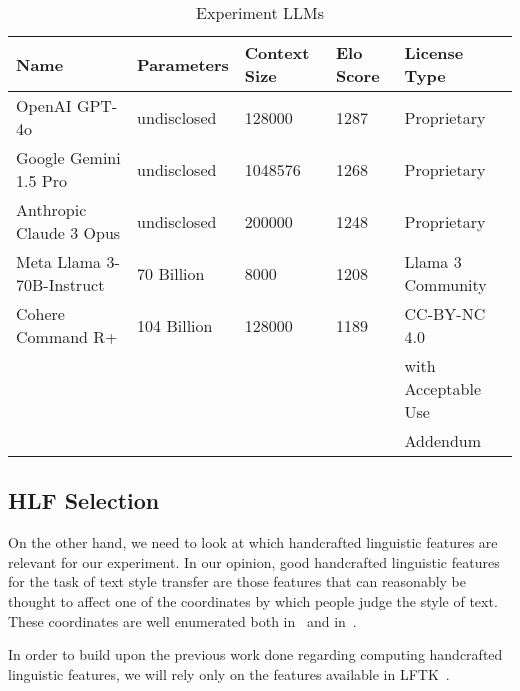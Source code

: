 \documentclass[runningheads,a4paper,11pt]{article}
\begin{document}
\begin{table}[ht]
    \setlength\tabcolsep{6pt}
    \centering
\begin{tabular}{@{}lllll@{}}\toprule
Name                      & Parameters           & Context Size        & Elo Score & License Type                                      \\ \toprule
OpenAI GPT-4o             & undisclosed          & 128000              & 1287      & Proprietary                                       \\
Google Gemini 1.5 Pro     & undisclosed          & 1048576             & 1268      & Proprietary                                       \\
Anthropic Claude 3 Opus   & undisclosed          & 200000              & 1248      & Proprietary                                       \\
Meta Llama 3-70B-Instruct & 70 Billion           & 8000                & 1208      & Llama 3 Community                                 \\
Cohere Command R+         & 104 Billion          & 128000              & 1189      & CC-BY-NC 4.0 \\
                          &                      &                     &           & with Acceptable Use\\
                          &                      &                     &           & Addendum\\ \bottomrule
\end{tabular}
\caption{Experiment LLMs}\label{table-llm}
\end{table}

\subsection{HLF Selection}\label{hlf-selection}

On the other hand, we need to look at which handcrafted linguistic features are
relevant for our experiment.
In our opinion, good handcrafted linguistic features for the task of text style
transfer are those features that can reasonably be thought to affect one of the
coordinates by which people judge the style of text.
These coordinates are well enumerated both in~\cite{tst-review-2021} and
in~\cite{tst-survey-2022}.

In order to build upon the previous work done regarding computing handcrafted
linguistic features, we will rely only on the features available in
LFTK~\cite{lftk-2023}.
\end{document}
